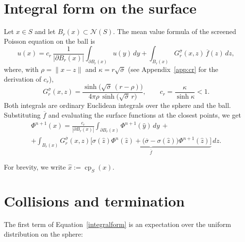 \documentclass[
]{elteiktdk}[2024/04/26]
\begin{document}
	\section{Integral form on the surface}
	\label{sec:method-integral}
	
	Let $x\in S$ and let $B_r(x)\subset\mathcal N(S)$. The mean value formula of the
	screened Poisson equation on the ball is
	\begin{equation}
		\label{theint}
		u(x)=c_r\,\frac{1}{|\partial B_r(x)|}\int_{\partial B_r(x)}u(y)\,dy
		+ \int_{B_r(x)}G^{\overline\sigma}_r(x,z)\,\overline f(z)\,dz ,
	\end{equation}
	where, with $\rho=\|x-z\|$ and $\kappa=r\sqrt{\overline\sigma}$ (see Appendix~\ref{app:cr} for the derivation of $c_r$),
	\begin{equation}
		G^{\overline\sigma}_r(x,z)=\frac{\sinh\!\big(\sqrt{\overline\sigma}\,(r-\rho)\big)}{4\pi\rho\,\sinh\!\big(\sqrt{\overline\sigma}\,r\big)},
		\qquad
		c_r=\frac{\kappa}{\sinh\kappa}<1 .
	\end{equation}
	Both integrals are ordinary Euclidean integrals over the sphere and the ball. Substituting $\overline f$ and evaluating the surface functions at the closest points, we get
	\begin{equation}
		\label{integralform}
		\begin{gathered}
			\Phi^{n+1}(x) =
			\frac{c_r}{|\partial B_r(x)|}
			\int_{\partial B_r(x)}
			\Phi^{n+1}(\hat{y})\,dy \, +\\[6pt]
			+ \int_{B_r(x)}G^{\overline\sigma}_r(x,z)
			\underbrace{\Big[
				\sigma(\hat{z})\Phi^n(\hat{z})
				+ \big(\overline\sigma-\sigma(\hat{z})\big)
				\Phi^{n+1}(\hat{z})
				\Big]}_{\overline{f}}\,dz .
		\end{gathered}
	\end{equation}
	
	\begin{remark}
		For brevity, we write $\hat{x} := \operatorname{cp}_S(x)$.
	\end{remark}
	
	\section{Collisions and termination}
	\label{sec:method-rr}
	
	The first term of Equation~\eqref{integralform} is an expectation over the uniform distribution on the sphere:
	
\end{document}
